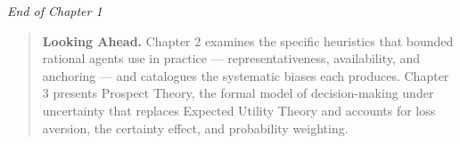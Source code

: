 \documentclass[12pt, letterpaper]{article}
\begin{document}
\medskip

\textit{End of Chapter 1}

\medskip

\begin{quote}
\textbf{Looking Ahead.} Chapter 2 examines the specific heuristics that bounded rational agents use in practice --- representativeness, availability, and anchoring --- and catalogues the systematic biases each produces. Chapter 3 presents Prospect Theory, the formal model of decision-making under uncertainty that replaces Expected Utility Theory and accounts for loss aversion, the certainty effect, and probability weighting.
\end{quote}
\end{document}
